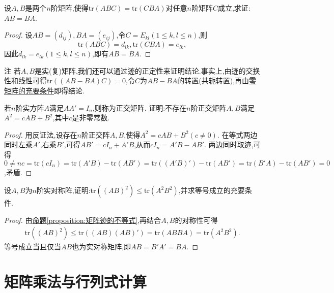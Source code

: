 \documentclass[lang=cn,newtx,10pt,scheme=chinese]{elegantbook}
\begin{document}
\begin{proposition}\label{proposition:矩阵可交换关于迹的充分条件}
设\(A,B\)是两个\(n\)阶矩阵,使得\(\mathrm{tr}(ABC)=\mathrm{tr}(CBA)\)对任意\(n\)阶矩阵\(C\)成立,求证:\(AB = BA\).
\end{proposition}
\begin{proof}
设\(AB=(d_{ij}),BA=(e_{ij})\),令\(C = E_{kl}(1\leq k,l\leq n)\),则
\[
\mathrm{tr}(ABC)=d_{lk},\mathrm{tr}(CBA)=e_{lk},
\]
因此\(d_{lk}=e_{lk}(1\leq k,l\leq n)\),即有\(AB = BA\).
\end{proof}
\begin{remark}
注 若\(A,B\)是实(复)矩阵,我们还可以通过迹的正定性来证明结论.事实上,由迹的交换性和线性可得\(\mathrm{tr}((AB - BA)C)=0\),令\(C\)为\(AB - BA\)的转置(共轭转置),再由\hyperref[proposition:零矩阵的充要条件]{零矩阵的充要条件}即得结论.
\end{remark}

\begin{example}
若\(n\)阶实方阵\(A\)满足\(AA' = I_n\),则称为正交矩阵. 证明:不存在\(n\)阶正交矩阵\(A,B\)满足\(A^2 = cAB + B^2\),其中\(c\)是非零常数.
\end{example}
\begin{proof}
用反证法,设存在\(n\)阶正交阵\(A,B\),使得\(A^2 = cAB + B^2(c\neq0)\). 在等式两边同时左乘\(A'\),右乘\(B'\),可得\(AB' = cI_n + A'B\),从而\(cI_n = A'B - AB'\). 两边同时取迹,可得\(0\ne nc=\text{tr}(cI_n)=\text{tr}(A'B)-\text{tr}(AB')=\text{tr}((A'B)') - \text{tr}(AB')=\text{tr}(B'A)-\text{tr}(AB') = 0\),矛盾.
\end{proof}

\begin{example}
设\(A,B\)为\(n\)阶实对称阵,证明:\(\text{tr}((AB)^2)\leq\text{tr}(A^2B^2)\),并求等号成立的充要条件.
\end{example}
\begin{proof}
由\hyperref[proposition:矩阵迹的不等式]{命题\ref{proposition:矩阵迹的不等式}},再结合$A,B$的对称性可得
\begin{align*}
\mathrm{tr}\left( \left( AB \right) ^2 \right) \leqslant \mathrm{tr}\left( \left( AB \right) \left( AB \right) \prime \right) =\mathrm{tr}\left( ABBA \right) =\mathrm{tr}\left( A^2B^2 \right) .
\end{align*}
等号成立当且仅当$AB$也为实对称矩阵,即\(AB = B'A'=BA\).
\end{proof}


\section{矩阵乘法与行列式计算}
\end{document}
